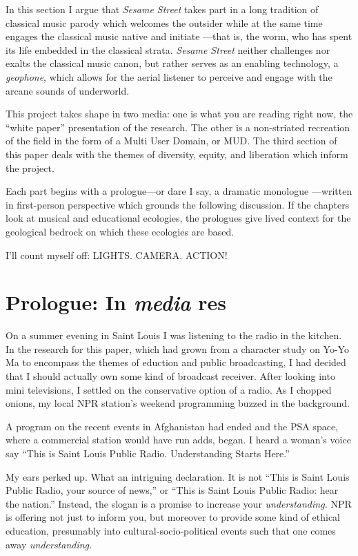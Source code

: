 \documentclass[12pt,letterpaper]{article}
\begin{document}
	In this section I argue that \textit{Sesame Street} takes part in a
	long tradition of classical music parody which welcomes the outsider
	while at the same time engages the classical music native and initiate
	---that is, the worm, who has spent its life embedded in the classical
	strata.
	\textit{Sesame Street} neither challenges nor exalts the classical 
	music canon, but rather serves as an enabling technology, a 
	\textit{geophone}, which allows for the aerial listener to perceive and  
	engage with the arcane sounds of underworld.  

	This project takes shape in two media: one is what you are reading 
	right now, the 
	``white paper'' presentation of the research. The other is a 
	non-striated recreation of the field in the form of a Multi User 
	Domain, or MUD. The third section of this paper deals with the themes
	of diversity,
	equity, and liberation which inform the project.  

	Each part begins with a prologue---or dare I say, a dramatic monologue
	---written in first-person perspective
	which grounds the following discussion. If the chapters look at
	musical and educational ecologies, the prologues give lived context for
	the geological bedrock on which these ecologies are based.  

	I'll count myself off: LIGHTS. CAMERA. ACTION!	

	\newpage	
	\section*{Prologue: In \textit{media} res}
	
	\noindent
	On a summer evening in Saint Louis I was listening to the radio in
	the kitchen. In the research for this paper, which had grown from a 
	character
	study on Yo-Yo Ma to encompass the themes of eduction and public 
	broadcasting,
	I had decided that I should actually own some kind of broadcast 
	receiver. 
	After looking into mini televisions, I settled on the conservative 
	option
	of a radio. As I chopped onions, my local NPR station's weekend 
	programming
	buzzed in the background.
	
	A program on the recent events in Afghanistan had ended and the PSA 
	space, where a commercial station
	would have run adds, began. I heard a woman's voice say ``This is Saint
	Louis Public Radio. Understanding Starts Here.'' 

	My ears perked up. What an intriguing declaration. It is not ``This is 
	Saint Louis Public Radio, your source of news,'' or ``This is Saint 
	Louis Public Radio: hear the nation.'' Instead, the 
	slogan is a 
	promise to increase your \textit{understanding. }NPR is offering not
	just to 
	inform you, but moreover to provide some kind of ethical education,
	presumably into cultural-socio-political events such that one comes away
	\textit{understanding.}
\end{document}
